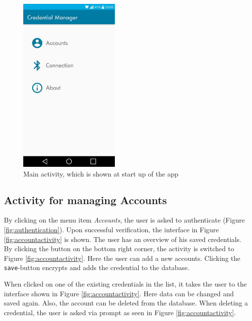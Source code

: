 \begin{figure}[!htb]
\centering
\includegraphics[width=5cm]{images/MainActivityNew}
\caption[Main activity]{Main activity, which is shown at start up of the app}
\label{fig:mainactivity}
\end{figure}


\subsection{Activity for managing Accounts}
By clicking on the menu item \textit{Accounts}, the user is asked to authenticate (Figure \ref{fig:authentication}\protect{}). Upon successful verification, the interface in Figure \ref{fig:accountactivity}\protect{} is shown. The user has an overview of his saved credentials. By clicking the button on the bottom right corner, the activity is switched to Figure \ref{fig:accountactivity}\protect{}. Here the user can add a new accounts. Clicking the \texttt{save}-button encrypts and adds the credential to the database.

When clicked on one of the existing credentials in the list, it takes the user to the interface shown in Figure \ref{fig:accountactivity}\protect{}.  Here data can be changed and saved again. Also, the account can be deleted from the database. When deleting a credential, the user is asked via prompt as seen in Figure \ref{fig:accountactivity}\protect{}.

